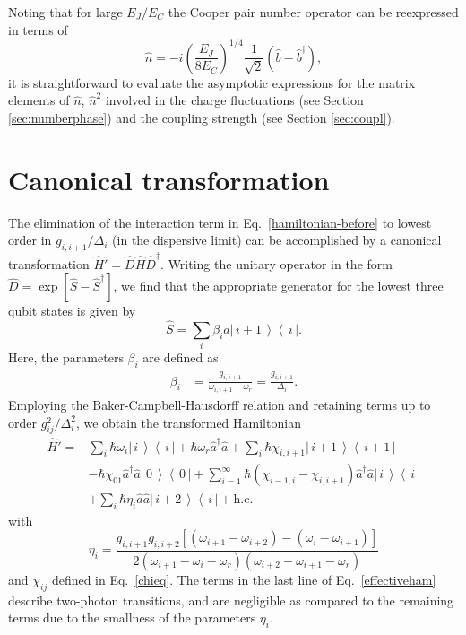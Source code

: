 \documentclass[twocolumn,amsmath,amssymb,floatfix,pra,showpacs,eqsecnum,footinbib,superscriptaddress]{revtex4}
\newcommand{\bra}[1]{\left\langle \, #1 \,\right|}
\newcommand{\ket}[1]{\left|\, #1 \, \right\rangle}
\newcommand{\be}{\begin{equation}}
\newcommand{\ee}{\end{equation}}
\begin{document}
Noting that for large $E_J/E_C$ the Cooper pair number operator can be reexpressed in terms of 
\be
\hat{n}=-i\left(\frac{E_J}{8E_C}\right)^{1/4}\frac{1}{\sqrt{2}}(\hat{b}-\hat{b}^\dag),
\ee
it is straightforward to evaluate the asymptotic expressions for the matrix elements of $\hat{n}$, $\hat{n}^2$ involved in the charge fluctuations (see Section \ref{sec:numberphase}) and the coupling strength (see Section \ref{sec:coupl}). 


\section{Canonical transformation\label{app1}}
The elimination of the interaction term in Eq.~\eqref{hamiltonian-before} to lowest order in $g_{i,i+1}/\Delta_i$ (in the dispersive limit) can be accomplished by a canonical transformation $\hat{H}'=\hat{D}\hat{H}\hat{D}^\dag$. Writing the unitary operator in the form $\hat{D}=\exp[\hat{S}-\hat{S}^\dag]$, we find that the appropriate generator for the lowest three qubit states is given by
\be
\hat{S}=\sum_i \beta_i \hat{a} \ket{i+1}\bra{i}.
\ee
Here,  the parameters $\beta_i$ are defined as
\begin{align}
\beta_i &=\frac{g_{i,i+1}}{\omega_{i,i+1}-\omega_r}=\frac{g_{i,i+1}}{\Delta_i}.
\end{align}
Employing the Baker-Campbell-Hausdorff relation and retaining terms up to order $g_{ij}^2/\Delta_i^2$, we obtain the transformed Hamiltonian
\begin{align}\label{effectiveham}\nonumber
\hat{H}'=& \sum_i\hbar\omega_i\ket{i}\bra{i} + \hbar\omega_r \hat{a}^\dag \hat{a} 
+ \sum_i \hbar\chi_{i,i+1}\ket{i+1}\bra{i+1}\\\nonumber
&-\hbar\chi_{01}\hat{a}^\dag \hat{a} \ket{0}\bra{0} + \sum_{i=1}^\infty \hbar(\chi_{i-1,i}-\chi_{i,i+1})\hat{a}^\dag \hat{a} \ket{i}\bra{i}\\
&+\sum_i\hbar \eta_i\hat{a}\hat{a}\ket{i+2}\bra{i} +\text{h.c.}
\end{align}
with
\be
\eta_i=\frac{g_{i,i+1}g_{i,i+2}[(\omega_{i+1}-\omega_{i+2})-(\omega_{i}-\omega_{i+1})]}{2(\omega_{i+1}-\omega_i-\omega_r)(\omega_{i+2}-\omega_{i+1}-\omega_r)}
\ee
and $\chi_{ij}$ defined in Eq.~\eqref{chieq}. The terms in the last line of Eq.~\eqref{effectiveham} describe two-photon transitions, and are negligible as compared to the remaining terms due to the smallness of the parameters $\eta_i$.
\end{document}
